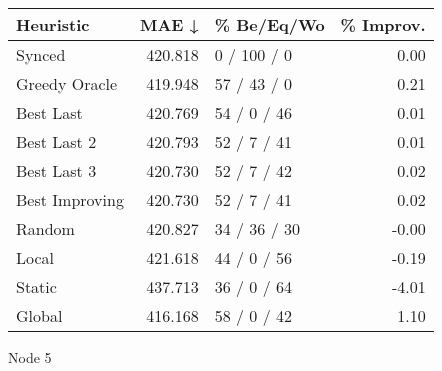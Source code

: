 \begin{tabular}{lrlr}
\toprule
\textbf{Heuristic} & \textbf{MAE ↓} & \textbf{\% Be/Eq/Wo} & \textbf{\% Improv.} \\
\midrule
            Synced &        420.818 &          0 / 100 / 0 &                0.00 \\
     Greedy Oracle &        419.948 &          57 / 43 / 0 &                0.21 \\
         Best Last &        420.769 &          54 / 0 / 46 &                0.01 \\
       Best Last 2 &        420.793 &          52 / 7 / 41 &                0.01 \\
       Best Last 3 &        420.730 &          52 / 7 / 42 &                0.02 \\
    Best Improving &        420.730 &          52 / 7 / 41 &                0.02 \\
            Random &        420.827 &         34 / 36 / 30 &               -0.00 \\
             Local &        421.618 &          44 / 0 / 56 &               -0.19 \\
            Static &        437.713 &          36 / 0 / 64 &               -4.01 \\
            Global &        416.168 &          58 / 0 / 42 &                1.10 \\
\bottomrule
\end{tabular}
\caption{Node 5}
\label{tab:non_lr01_le1_bs2_5}
